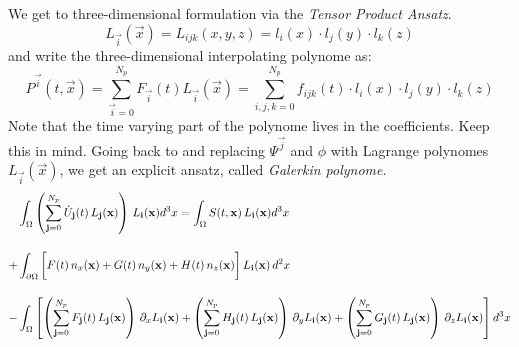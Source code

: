 
We get to three-dimensional formulation via the \emph{Tensor Product Ansatz}.
\newcommand{\LI}{L_{\vec{i}}(\vec{x})}
\begin{equation}
\label{eq-tensor-ansatz}
    \LI = L_{ijk}(x,y,z) = l_i(x) \cdot l_j(y) \cdot l_k(z)
\end{equation}
and write the three-dimensional interpolating polynome as:
\newcommand{\PI}{P^{\vec{i}}(t,\vec{x})}
\newcommand{\FI}{F_{\vec{i}}(t)}
\newcommand{\sumI}{\sum^{N_p}_{\vec{i}=0}}
\begin{equation}
\label{eq-tensor-ansatz-interpolant}
    \PI = \sumI \FI \LI = \sum^{N_p}_{i,j,k = 0} f_{ijk}(t) \cdot l_i(x) \cdot l_j(y) \cdot l_k(z)
\end{equation}
Note that the time varying part of the polynome lives in the coefficients.
Keep this in mind.
\newcommand{\FJ}{F_{\vec{j}}(t)}
\newcommand{\GJ}{G_{\vec{j}}(t)}
\newcommand{\HJ}{H_{\vec{j}}(t)}
\newcommand{\STX}{S(t,\vec{x})}
\newcommand{\UJ}{ \dot{U}_{\vec{j}}(t)}
\newcommand{\LJ}{L_{\vec{j}}(\vec{x})}
\newcommand{\sumJ}{\sum^{N_p}_{\vec{j}=0}}
\newcommand{\nx}{n_x(\vec{x})}
\newcommand{\ny}{n_y(\vec{x})}
\newcommand{\nz}{n_z(\vec{x})}
Going back to  and replacing $\Psi^{\vec{j}}$
and $\phi$ with Lagrange polynomes $\LI$, we get an explicit ansatz, called
\emph{Galerkin polynome}.
\begin{align}
     &\int_\Omega \left(\sumJ \UJ \, \LJ \right) \, \LI d^3x = \int_\Omega \STX \, \LI d^3x \nonumber \br
    +&\int_{\partial\Omega} \bigg[ F(t) \, \nx + G(t) \, \ny + H(t)\, \nz \bigg]\,\LI\, d^2x \br
    -&\int_\Omega \left[
          \left(\sumJ \FJ \, \LJ \right) \, \partial_x \LI 
        + \left(\sumJ \HJ \, \LJ \right) \, \partial_y \LI
        + \left(\sumJ \GJ \, \LJ \right) \, \partial_z \LI \right] d^3x \nonumber
\end{align}

\newcommand{\sumK}{\sum^{N_p}_{\vec{k}=0}}
\newcommand{\wK}{\omega_{\vec{k}}}

\newcommand{\STXK}{S(t,\vec{x}_{\vec{k}})}
\newcommand{\LIK}{L_{\vec{i}}(\vec{x}_{\vec{k}})}
\newcommand{\LJK}{L_{\vec{j}}(\vec{x}_{\vec{k}})}

\newcommand{\LXIK}{L^{(x)}_{\vec{i}}(\vec{x}_{\vec{k}})}
\newcommand{\LYIK}{L^{(y)}_{\vec{i}}(\vec{x}_{\vec{k}})}
\newcommand{\LZIK}{L^{(z)}_{\vec{i}}(\vec{x}_{\vec{k}})}

